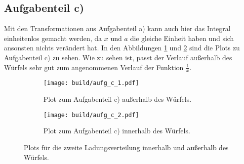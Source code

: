 \subsection*{Aufgabenteil c)}
Mit den Transformationen aus Aufgabenteil a) kann auch hier das Integral einheitenlos
gemacht werden, da $x$ und $a$ die gleiche Einheit haben und sich ansonsten nichts
verändert hat.
In den Abbildungen \ref{subfig:c_1} und \ref{subfig:c_2} sind die Plots zu
Aufgabenteil c) zu sehen. Wie zu sehen ist, passt der Verlauf außerhalb des Würfels
sehr gut zum angenommenen Verlauf der Funktion $\frac{1}{x}$.
\begin{figure}
  \centering
  \begin{subfigure}{0.49\textwidth}
    \centering
    \texttt{[image: build/aufg\_c\_1.pdf]}
    \caption{Plot zum Aufgabenteil c) außerhalb des Würfels.}
    \label{subfig:c_1}
  \end{subfigure}
  \begin{subfigure}{0.49\textwidth}
    \centering
    \texttt{[image: build/aufg\_c\_2.pdf]}
    \caption{Plot zum Aufgabenteil c) innerhalb des Würfels.}
    \label{subfig:c_2}
  \end{subfigure}
  \caption{Plots für die zweite Ladungsverteilung innerhalb und außerhalb
  des Würfels.}
  \label{fig:2}
\end{figure}
